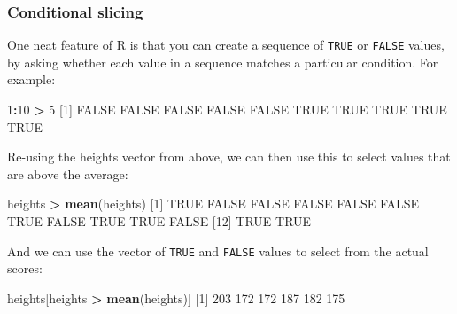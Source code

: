 \documentclass[]{article}
\newenvironment{Shaded}{\begin{snugshade}}{\end{snugshade}}
\newcommand{\DecValTok}[1]{\textcolor[rgb]{0.00,0.00,0.81}{#1}}
\newcommand{\KeywordTok}[1]{\textcolor[rgb]{0.13,0.29,0.53}{\textbf{#1}}}
\newcommand{\NormalTok}[1]{#1}
\newcommand{\OperatorTok}[1]{\textcolor[rgb]{0.81,0.36,0.00}{\textbf{#1}}}
\newcommand{\OtherTok}[1]{\textcolor[rgb]{0.56,0.35,0.01}{#1}}
\newcommand{\StringTok}[1]{\textcolor[rgb]{0.31,0.60,0.02}{#1}}
\begin{document}
\hypertarget{conditional-slices}{%
\subsubsection*{Conditional slicing}\label{conditional-slices}}

One neat feature of R is that you can create a sequence of \texttt{TRUE} or \texttt{FALSE}
values, by asking whether each value in a sequence matches a particular
condition. For example:

\begin{Shaded}
\begin{Highlighting}[]
\DecValTok{1}\OperatorTok{:}\DecValTok{10} \OperatorTok{>}\StringTok{ }\DecValTok{5}
\NormalTok{ [}\DecValTok{1}\NormalTok{] }\OtherTok{FALSE} \OtherTok{FALSE} \OtherTok{FALSE} \OtherTok{FALSE} \OtherTok{FALSE}  \OtherTok{TRUE}  \OtherTok{TRUE}  \OtherTok{TRUE}  \OtherTok{TRUE}  \OtherTok{TRUE}
\end{Highlighting}
\end{Shaded}

Re-using the heights vector from above, we can then use this to select values
that are above the average:

\begin{Shaded}
\begin{Highlighting}[]
\NormalTok{heights }\OperatorTok{>}\StringTok{ }\KeywordTok{mean}\NormalTok{(heights)}
\NormalTok{ [}\DecValTok{1}\NormalTok{]  }\OtherTok{TRUE} \OtherTok{FALSE} \OtherTok{FALSE} \OtherTok{FALSE} \OtherTok{FALSE} \OtherTok{FALSE}  \OtherTok{TRUE} \OtherTok{FALSE}  \OtherTok{TRUE}  \OtherTok{TRUE} \OtherTok{FALSE}
\NormalTok{[}\DecValTok{12}\NormalTok{]  }\OtherTok{TRUE}  \OtherTok{TRUE}
\end{Highlighting}
\end{Shaded}

And we can use the vector of \texttt{TRUE} and \texttt{FALSE} values to select from the actual
scores:

\begin{Shaded}
\begin{Highlighting}[]
\NormalTok{heights[heights }\OperatorTok{>}\StringTok{ }\KeywordTok{mean}\NormalTok{(heights)]}
\NormalTok{[}\DecValTok{1}\NormalTok{] }\DecValTok{203} \DecValTok{172} \DecValTok{172} \DecValTok{187} \DecValTok{182} \DecValTok{175}
\end{Highlighting}
\end{Shaded}
\end{document}

